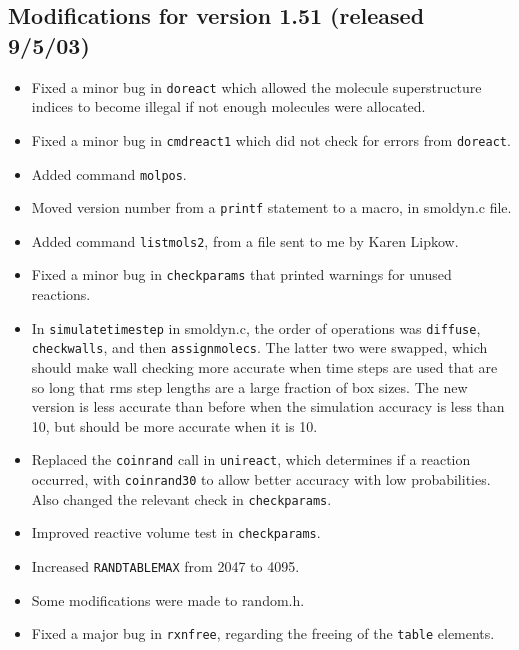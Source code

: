 \documentclass {book}
\begin{document}
\subsection*{Modifications for version 1.51 (released 9/5/03)}
\begin{itemize}
\item Fixed a minor bug in \texttt{doreact} which allowed the molecule superstructure indices to become illegal if not enough molecules were allocated.
\item Fixed a minor bug in \texttt{cmdreact1} which did not check for errors from \texttt{doreact}.
\item Added command \texttt{molpos}.
\item Moved version number from a \texttt{printf} statement to a macro, in smoldyn.c file.
\item Added command \texttt{listmols2}, from a file sent to me by Karen Lipkow.
\item Fixed a minor bug in \texttt{checkparams} that printed warnings for unused reactions.
\item In \texttt{simulatetimestep} in smoldyn.c, the order of operations was \texttt{diffuse}, \texttt{checkwalls}, and then \texttt{assignmolecs}.  The latter two were swapped, which should make wall checking more accurate when time steps are used that are so long that rms step lengths are a large fraction of box sizes.  The new version is less accurate than before when the simulation accuracy is less than 10, but should be more accurate when it is 10.
\item Replaced the \texttt{coinrand} call in \texttt{unireact}, which determines if a reaction occurred, with \texttt{coinrand30} to allow better accuracy with low probabilities.  Also changed the relevant check in \texttt{checkparams}.
\item Improved reactive volume test in \texttt{checkparams}.
\item Increased \texttt{RANDTABLEMAX} from 2047 to 4095.
\item Some modifications were made to random.h.
\item Fixed a major bug in \texttt{rxnfree}, regarding the freeing of the \texttt{table} elements.
\end{itemize}
\end{document}
